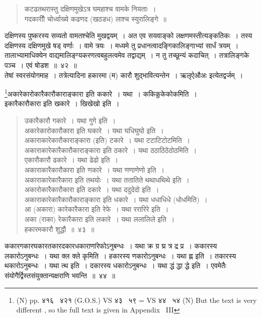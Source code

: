 \documentclass[11pt, openany]{book}
\begin{document}
\begin{quote}
{\qt  कटढतथरास्तु दक्षिणमुखेऽत्र घमहाश्च वामके नियताः~।\\
 गदकारीौ चोर्ध्वाख्ये कढणद (खठडध) लाश्च स्युरालिङ्गे~॥}
\end{quote}

\noindent
दक्षिणस्य पुष्करस्य सव्यतो वामतश्चेति मुखद्वयम्~। अत एव सयवाङ्को लक्षणमस्तीत्यङ्कतिकः~। तस्य दक्षिणस्य {\qtt दक्षिणमुखे} षड् वर्णाः~। वामे त्रयः~। मध्यमे तु प्रधानत्वादङ्गिकालिङ्गाभ्यां सार्धं त्रयम्~। तालाभ्यामाधिक्येन वाद्यमालिङ्ग्यकरणत्वबहुलत्वमेव तद्वाद्यम्~। न तु तच्छून्यं कदाचित्~। तत्रालिङ्गके पञ्च~। एवं षोडश~॥~४२~॥\\

तेषां स्वरसंयोगमाह~। तत्रेत्यादिना हकारमा (म) कारौ शुद्भावित्यन्तेन~। ऋलृऐऔअः इत्येतद्वर्जम्~। 

\newpage

\noindent
{\qt \renewcommand{\thefootnote}{1}\footnote{(N) pp. ४१६ \textendash\ ४२१ (G.O.S.) VS ४३ \textendash\ ५९ = VS ४४ \textendash\ ५४ (N) But the text is very different , so the full text is given in Appendix  \textendash\  III}अकारेकारोकारैकारौकाराङ्कारा इति ककारे~। यथा~। ककिकुकेकोकमिति~।\\
इकारैकारौकारा इति खकारे~। खिखेखो इति~।}

\begin{quote}
{\na  उकारैकारौ गकारे~। यथा गुगे इति~। \\
 अकारेकारोकारौकारा इति घकारे~। यथा घधिघुघो इति~। \\
 अकाराकारेकारौकाराङ्कारा (इति) टकारे~। यथा टटाटिटोटमिति~। \\
 अकाराकारेकारैकारौकाराङ्कारा इति ठकारे~। यथा ठठाठिठेठोठमिति~। \\
 एकारौकारौ ढकारे~। यथा ढेढो इति~।\\
 अकाराकारैकारौकारा इति णकारे~। यथा णणाणेणो इति~।\\
 अकाराकारेकारैकारा इति तथयोः~। यथा ततातिते थथाधथिथे इति~।\\
 अकारोकारैकारौकारा इति दकारे~। यथा ददुदेदो इति~।\\
 अकाराकारेकारैकारौकाराङ्कारा इति धकारे~। यथा धधाधिधे (धोधमिति)~।\\
 आ (अकारा) कारेकारैकारा इति रेफे~। यथा ररारिरे इति~।\\
 अका (राका) रेकारैकारा इति लकारे~। यथा ललालिले इति~।\\
 हकारमकारौ शुद्धौ~॥~४३~॥}
\end{quote}

{\qt ककारगकारघकारतकारदकारधकाराणांरेफोऽनुबन्धः~। यथा क्र ग्र घ्र त्र द्र प्र~। ककारस्य लकारोऽनुबन्धः~। यथा क्ल क्ले कृमिति~। हकारस्य णकारोऽनुबन्धः~। यथा ह्ण इति~। तकारस्य थकारोऽनुबन्धः~। यथा त्थ इति~। दकारस्य धकारोऽनुबन्धः~। यथा द्धं द्धा द्धे इति~। एवमेतैः संयोगैर्द्विस्तसंयुक्तान्यक्षराणि भवन्ति~॥~४४~॥}
\end{document}
